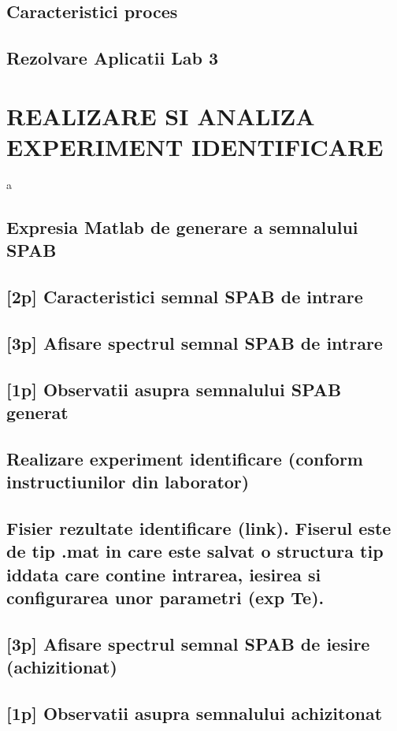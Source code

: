 \documentclass[12pt,english]{article}
\begin{document}
\subsection { Caracteristici proces }
\subsection { Rezolvare Aplicatii Lab 3 }

\section { REALIZARE SI ANALIZA EXPERIMENT IDENTIFICARE }
a
\subsection { Expresia Matlab de generare a semnalului SPAB }
\subsection { [2p] Caracteristici semnal SPAB de intrare }
\subsection { [3p] Afisare spectrul semnal SPAB de intrare }
\subsection { [1p] Observatii asupra semnalului SPAB generat }
\subsection { Realizare experiment identificare (conform instructiunilor din laborator) }
\subsection { Fisier rezultate identificare (link). Fiserul este de tip .mat in care este salvat o structura tip iddata care contine intrarea, iesirea si configurarea unor parametri (exp Te). }
\subsection { [3p] Afisare spectrul semnal SPAB de iesire (achizitionat) }
\subsection { [1p] Observatii asupra semnalului achizitonat }
\end{document}
